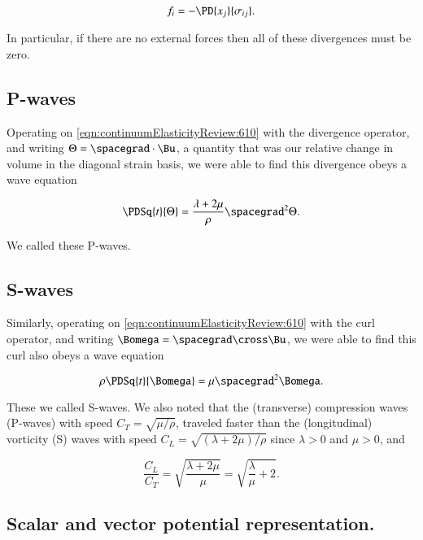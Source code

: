 \begin{equation}\label{eqn:continuumFluidsReviewXX:1090b}
f_i = - \PD{x_j}{\sigma_{ij}}.
\end{equation}

In particular, if there are no external forces then all of these divergences must be zero.  

\subsection{P-waves}

Operating on \ref{eqn:continuumElasticityReview:610} with the divergence operator, and writing $\Theta = \spacegrad \cdot \Bu$, a quantity that was our relative change in volume in the diagonal strain basis, we were able to find this divergence obeys a wave equation

\begin{equation}\label{eqn:continuumElasticityReview:630}
\PDSq{t}{\Theta} = \frac{\lambda + 2 \mu}{\rho} \spacegrad^2 \Theta.
\end{equation}

We called these P-waves.

\subsection{S-waves}

Similarly, operating on \ref{eqn:continuumElasticityReview:610} with the curl operator, and writing $\Bomega = \spacegrad \cross \Bu$, we were able to find this curl also obeys a wave equation

\begin{equation}\label{eqn:continuumElasticityReview:650}
\rho \PDSq{t}{\Bomega} = \mu \spacegrad^2 \Bomega.
\end{equation}

These we called S-waves.  We also noted that the (transverse) compression waves (P-waves) with speed $C_T = \sqrt{\mu/\rho}$, traveled faster than the (longitudinal) vorticity (S) waves with speed $C_L = \sqrt{(\lambda + 2 \mu)/\rho}$ since $\lambda > 0$ and $\mu > 0$, and 

\begin{equation}\label{eqn:continuumElasticityReview:670}
\frac{C_L}{C_T} = \sqrt{\frac{ \lambda + 2 \mu}{\mu}} = \sqrt{ \frac{\lambda}{\mu} + 2}.
\end{equation}

\subsection{Scalar and vector potential representation.}

